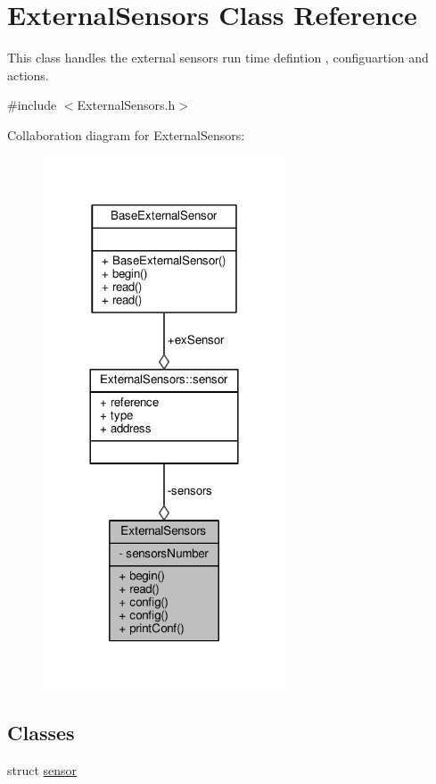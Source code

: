\hypertarget{class_external_sensors}{}\section{External\+Sensors Class Reference}
\label{class_external_sensors}


This class handles the external sensors run time defintion , configuartion and actions.  




{\ttfamily \#include $<$External\+Sensors.\+h$>$}



Collaboration diagram for External\+Sensors\+:
\nopagebreak
\begin{figure}[H]
\begin{center}
\leavevmode
\includegraphics[width=204pt]{class_external_sensors__coll__graph}
\end{center}
\end{figure}
\subsection*{Classes}
\begin{DoxyCompactItemize}
\item 
struct \hyperlink{struct_external_sensors_1_1sensor}{sensor}
\end{DoxyCompactItemize}

